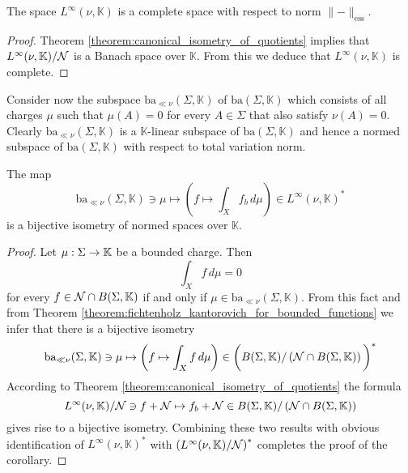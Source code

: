 \begin{corollary}\label{corollary:L_infty_is_complete}
    The space $L^{\infty}(\nu,\mathbb{K})$ is a complete space with respect to norm $\lVert - \rVert_{\mathrm{ess}}$.
\end{corollary}
\begin{proof}
    Theorem \ref{theorem:canonical_isometry_of_quotients} implies that $L^{\infty}(\nu,\mathbb{K})/{\mathcal N}$ is a Banach space over $\mathbb{K}$. From this we deduce that $L^{\infty}(\nu,\mathbb{K})$ is complete.
\end{proof}
\noindent
Consider now the subspace $\mathrm{ba}_{\ll \nu}(\Sigma, \mathbb{K})$ of $\mathrm{ba}(\Sigma, \mathbb{K})$ which consists of all charges $\mu$ such that $\mu(A) = 0$ for every $A \in \Sigma$ that also satisfy $\nu(A) = 0$. Clearly $\mathrm{ba}_{\ll \nu}(\Sigma, \mathbb{K})$ is a $\mathbb{K}$-linear subspace of $\mathrm{ba}(\Sigma, \mathbb{K})$ and hence a normed subspace of $\mathrm{ba}(\Sigma, \mathbb{K})$ with respect to total variation norm.

\begin{corollary}\label{corollary:functionals_for_L_infinity}
    The map
    $$\mathrm{ba}_{\ll \nu}(\Sigma, \mathbb{K}) \ni \mu \mapsto \left(f \mapsto \int_X f_b\,d\mu\right) \in L^{\infty}(\nu,\mathbb{K})^*$$
    is a bijective isometry of normed spaces over $\mathbb{K}$.
\end{corollary}
\begin{proof}
    Let $\mu:\Sigma \rightarrow \mathbb{K}$ be a bounded charge. Then
    $$\int_Xf\,d\mu = 0$$
    for every $f \in {\mathcal N} \cap B(\Sigma,\mathbb{K})$ if and only if $\mu \in \mathrm{ba}_{\ll \nu}(\Sigma, \mathbb{K})$. From this fact and from Theorem \ref{theorem:fichtenholz_kantorovich_for_bounded_functions} we infer that there is a bijective isometry
    $$\mathrm{ba}_{\ll \nu}(\Sigma, \mathbb{K}) \ni \mu \mapsto \left(f \mapsto \int_Xf\,d\mu\right) \in
        \bigg(B(\Sigma,\mathbb{K})/\left({\mathcal N}\cap B(\Sigma,\mathbb{K})\right)\bigg)^*$$
    According to Theorem \ref{theorem:canonical_isometry_of_quotients} the formula
    $$L^{\infty}(\nu,\mathbb{K})/{\mathcal N} \ni f + {\mathcal N} \mapsto f_b + {\mathcal N} \in B(\Sigma,\mathbb{K})/\left({\mathcal N}\cap B(\Sigma,\mathbb{K})\right)$$
    gives rise to a bijective isometry. Combining these two results with obvious identification of $L^{\infty}(\nu,\mathbb{K})^*$ with $\left(L^{\infty}(\nu,\mathbb{K})/{\mathcal N}\right)^*$ completes the proof of the corollary.
\end{proof}






\small



